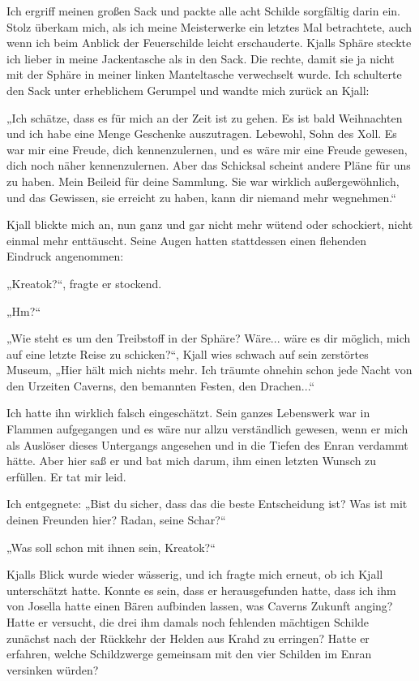 Ich ergriff meinen großen Sack und packte alle acht Schilde sorgfältig darin ein. Stolz überkam mich, als ich meine Meisterwerke ein letztes Mal betrachtete, auch wenn ich beim Anblick der Feuerschilde leicht erschauderte. Kjalls Sphäre steckte ich lieber in meine Jackentasche als in den Sack. Die rechte, damit sie ja nicht mit der Sphäre in meiner linken Manteltasche verwechselt wurde. Ich schulterte den Sack unter erheblichem Gerumpel und wandte mich zurück an Kjall:

„Ich schätze, dass es für mich an der Zeit ist zu gehen. Es ist bald Weihnachten und ich habe eine Menge Geschenke auszutragen. Lebewohl, Sohn des Xoll. Es war mir eine Freude, dich kennenzulernen, und es wäre mir eine Freude gewesen, dich noch näher kennenzulernen. Aber das Schicksal scheint andere Pläne für uns zu haben. Mein Beileid für deine Sammlung. Sie war wirklich außergewöhnlich, und das Gewissen, sie erreicht zu haben, kann dir niemand mehr wegnehmen.“

Kjall blickte mich an, nun ganz und gar nicht mehr wütend oder schockiert, nicht einmal mehr enttäuscht. Seine Augen hatten stattdessen einen flehenden Eindruck angenommen:

„Kreatok?“, fragte er stockend.

„Hm?“

„Wie steht es um den Treibstoff in der Sphäre? Wäre... wäre es dir möglich, mich auf eine letzte Reise zu schicken?“, Kjall wies schwach auf sein zerstörtes Museum, „Hier hält mich nichts mehr. Ich träumte ohnehin schon jede Nacht von den Urzeiten Caverns, den bemannten Festen, den Drachen...“

Ich hatte ihn wirklich falsch eingeschätzt. Sein ganzes Lebenswerk war in Flammen aufgegangen und es wäre nur allzu verständlich gewesen, wenn er mich als Auslöser dieses Untergangs angesehen und in die Tiefen des Enran verdammt hätte. Aber hier saß er und bat mich darum, ihm einen letzten Wunsch zu erfüllen. Er tat mir leid.

Ich entgegnete: „Bist du sicher, dass das die beste Entscheidung ist? Was ist mit deinen Freunden hier? Radan, seine Schar?“

„Was soll schon mit ihnen sein, Kreatok?“

Kjalls Blick wurde wieder wässerig, und ich fragte mich erneut, ob ich Kjall unterschätzt hatte. Konnte es sein, dass er herausgefunden hatte, dass ich ihm von Josella hatte einen Bären aufbinden lassen, was Caverns Zukunft anging? Hatte er versucht, die drei ihm damals noch fehlenden mächtigen Schilde zunächst nach der Rückkehr der Helden aus Krahd zu erringen? Hatte er erfahren, welche Schildzwerge gemeinsam mit den vier Schilden im Enran versinken würden?

